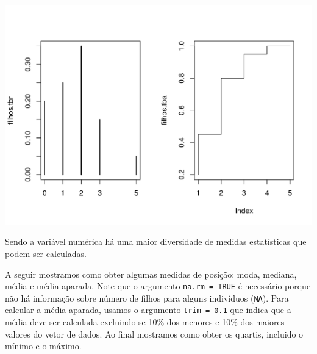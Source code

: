 \documentclass[10pt,a4paper]{book}
\newenvironment{Shaded}{\begin{snugshade}}{\end{snugshade}}
\newcommand{\KeywordTok}[1]{\textcolor[rgb]{0.13,0.29,0.53}{\textbf{#1}}}
\newcommand{\DataTypeTok}[1]{\textcolor[rgb]{0.13,0.29,0.53}{#1}}
\newcommand{\DecValTok}[1]{\textcolor[rgb]{0.00,0.00,0.81}{#1}}
\newcommand{\FloatTok}[1]{\textcolor[rgb]{0.00,0.00,0.81}{#1}}
\newcommand{\StringTok}[1]{\textcolor[rgb]{0.31,0.60,0.02}{#1}}
\newcommand{\OtherTok}[1]{\textcolor[rgb]{0.56,0.35,0.01}{#1}}
\newcommand{\OperatorTok}[1]{\textcolor[rgb]{0.81,0.36,0.00}{\textbf{#1}}}
\newcommand{\NormalTok}[1]{#1}
\begin{document}
\begin{center}\includegraphics{figures/unnamed-chunk-300-1} \end{center}

Sendo a variável numérica há uma maior diversidade de medidas
estatísticas que podem ser calculadas.

A seguir mostramos como obter algumas medidas de posição: moda, mediana,
média e média aparada. Note que o argumento \texttt{na.rm\ =\ TRUE} é
necessário porque não há informação sobre número de filhos para alguns
indivíduos (\texttt{NA}). Para calcular a média aparada, usamos o
argumento \texttt{trim\ =\ 0.1} que indica que a média deve ser
calculada excluindo-se 10\% dos menores e 10\% dos maiores valores do
vetor de dados. Ao final mostramos como obter os quartis, incluido o
mínimo e o máximo.

\begin{Shaded}
\end{Shaded}
\end{document}
